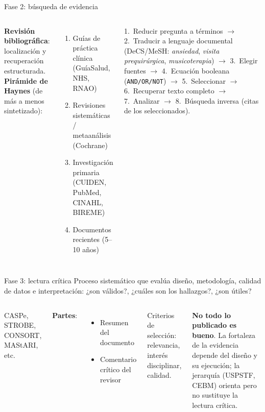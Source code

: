 \documentclass[aspectratio=169,8pt]{beamer}
\begin{document}
\begin{frame}{Fase 2: b\'usqueda de evidencia}
  \small
  \begin{columns}[T,onlytextwidth]
      \textbf{Revisi\'on bibliogr\'afica}: localizaci\'on y recuperaci\'on estructurada.\\[3pt]
      \textbf{Pir\'amide de Haynes} (de m\'as a menos sintetizado):
      \begin{enumerate}
        \item Gu\'ias de pr\'actica cl\'inica (Gu\'iaSalud, NHS, RNAO)
        \item Revisiones sistem\'aticas / metaan\'alisis (Cochrane)
        \item Investigaci\'on primaria (CUIDEN, PubMed, CINAHL, BIREME)
        \item Documentos recientes (5--10 a\~nos)
      \end{enumerate}
      \begin{tcolorbox}[infobox,title=Pasos de b\'usqueda]
        \scriptsize
        1.\ Reducir pregunta a t\'erminos $\to$ 2.\ Traducir a lenguaje documental (DeCS/MeSH: \emph{ansiedad}, \emph{visita prequir\'urgica}, \emph{musicoterapia}) $\to$ 3.\ Elegir fuentes $\to$ 4.\ Ecuaci\'on booleana (\texttt{AND/OR/NOT}) $\to$ 5.\ Seleccionar $\to$ 6.\ Recuperar texto completo $\to$ 7.\ Analizar $\to$ 8.\ B\'usqueda inversa (citas de los seleccionados).
      \end{tcolorbox}
    \end{columns}
\end{frame}

\begin{frame}{Fase 3: lectura cr\'itica}
  \small
  Proceso sistem\'atico que eval\'ua dise\~no, metodolog\'ia, calidad de datos e interpretaci\'on: ¿son v\'alidos?, ¿cu\'ales son los hallazgos?, ¿son \'utiles?
  \vspace{0.4em}
  \begin{columns}[T,onlytextwidth]
      \begin{tcolorbox}[formulabox,title=Gu\'ias seg\'un metodolog\'ia]
        \footnotesize CASPe, STROBE, CONSORT, MAStARI, etc.
      \end{tcolorbox}
      \textbf{Partes}:
      \begin{itemize}
        \item Resumen del documento
        \item Comentario cr\'itico del revisor
      \end{itemize}
      {\scriptsize Criterios de selecci\'on: relevancia, inter\'es disciplinar, calidad.}
      \begin{tcolorbox}[amberbox]
        \footnotesize\textbf{No todo lo publicado es bueno}. La fortaleza de la evidencia depende del dise\~no y su ejecuci\'on; la jerarqu\'ia (USPSTF, CEBM) orienta pero no sustituye la lectura cr\'itica.
      \end{tcolorbox}
    \end{columns}
\end{frame}
\end{document}
